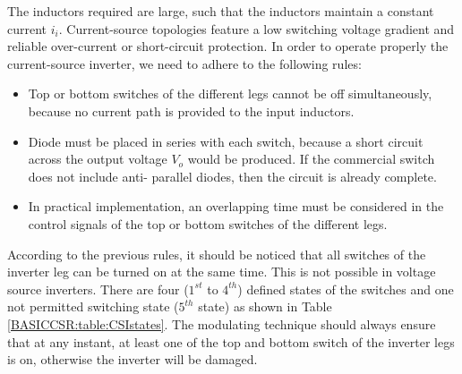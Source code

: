 The inductors required are large, such that the inductors
maintain a constant current $i_i$. Current-source topologies feature a low switching voltage gradient and reliable over-current or short-circuit protection. In order to operate properly the current-source inverter, we need to adhere to the following rules:
\begin{itemize}
\item Top or bottom switches of the different legs cannot be off simultaneously, because no current path is provided to the input inductors.
\item Diode must be placed in series with each switch, because a short circuit across the output voltage $V_o$ would be produced. If the commercial switch does not include anti- parallel diodes, then the circuit is already complete.
\item In practical implementation, an overlapping time must be considered in the control signals of the top or bottom switches of the different legs.
\end{itemize}

According to the previous rules, it should be noticed that all switches of the inverter leg can be turned on at the same time. This is not possible in voltage source inverters. There are four ($1^{st}$ to $4^{th}$) defined states of the switches and one not permitted switching state ($5^{th}$ state) as shown in Table \ref{BASICCSR:table:CSIstates}. The modulating technique should always ensure that at any instant, at least one of the top and bottom switch of the inverter legs is on, otherwise the inverter will be damaged.

